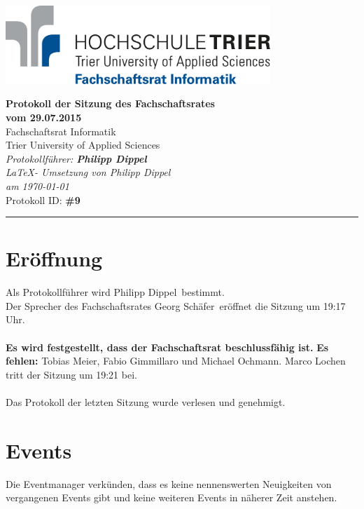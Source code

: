 \documentclass[a4paper, 11pt]{article} %
\newcommand{\protokoller}{Philipp Dippel}
\newcommand{\dateOfMeeting}{29.07.2015}
\newcommand{\TeXer}{Philipp Dippel}
\newcommand{\fsiPresident}{Georg Schäfer}
\newcommand{\protocolID}{9}
\begin{document}

\doublespacing
\thispagestyle{empty}

\begin{center}
\includegraphics[width=10.0cm]{../logo_fsi.eps}

\vspace*{\fill}
{\LARGE \textbf{Protokoll der Sitzung des Fachschaftsrates \\vom \dateOfMeeting}}\\
Fachschaftsrat Informatik\\
Trier University of Applied Sciences\\
\vspace{2.5cm}
\textit{
	Protokollführer: \textbf{\protokoller} \\
	\LaTeX - Umsetzung von \TeXer\\
	am \today\\
}
Protokoll ID: \textbf{\#\protocolID}
\vfill
\end{center}

\hspace*{-35cm}
\textcolor{fsi}{\rule{64.9cm}{15pt}}
\pagebreak

\setcounter{tocdepth}{2}
\tableofcontents
\pagebreak

\section{Eröffnung}
Als Protokollführer wird \protokoller~bestimmt.\\
Der Sprecher des Fachschaftsrates \fsiPresident~eröffnet die Sitzung um 19:17 Uhr.
\\\\
\textbf{Es wird festgestellt, dass der Fachschaftsrat beschlussfähig ist.}
\textbf{Es fehlen:} Tobias Meier, Fabio Gimmillaro und Michael Ochmann.
Marco Lochen tritt der Sitzung um 19:21 bei.
\\\\
Das Protokoll der letzten Sitzung wurde verlesen und genehmigt.

\section{Events}
Die Eventmanager verkünden, dass es keine nennenswerten Neuigkeiten von vergangenen Events gibt und keine weiteren Events in näherer Zeit anstehen.
\end{document}
